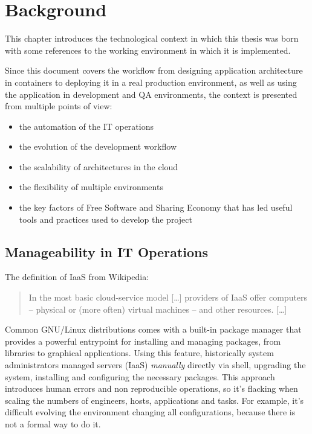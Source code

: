 \chapter{Background}\label{background}

This chapter introduces the technological context in which this thesis
was born with some references to the working environment in which it is
implemented.

Since this document covers the workflow from designing application
architecture in containers to deploying it in a real production
environment, as well as using the application in development and QA
environments, the context is presented from multiple points of view:

\begin{itemize}
\itemsep1pt\parskip0pt
\item
  the automation of the IT operations
\item
  the evolution of the development workflow
\item
  the scalability of architectures in the cloud
\item
  the flexibility of multiple environments
\item
  the key factors of Free Software and Sharing Economy that has led
  useful tools and practices used to develop the project
\end{itemize}

\section{Manageability in IT
Operations}\label{manageability-in-it-operations}

The definition of IaaS from Wikipedia\cite{CloudComputing}:

\begin{quote}
In the most basic cloud-service model {[}\ldots{}{]} providers of IaaS
offer computers -- physical or (more often) virtual machines -- and
other resources. {[}\ldots{}{]}
\end{quote}

Common GNU/Linux distributions comes with a built-in package manager
that provides a powerful entrypoint for installing and managing
packages, from libraries to graphical applications. Using this feature,
historically system administrators managed servers (IaaS)
\emph{manually} directly via shell, upgrading the system, installing and
configuring the necessary packages. This approach introduces human
errors and non reproducible operations, so it's flacking when scaling
the numbers of engineers, hosts, applications and tasks. For example,
it's difficult evolving the environment changing all configurations,
because there is not a formal way to do it.

